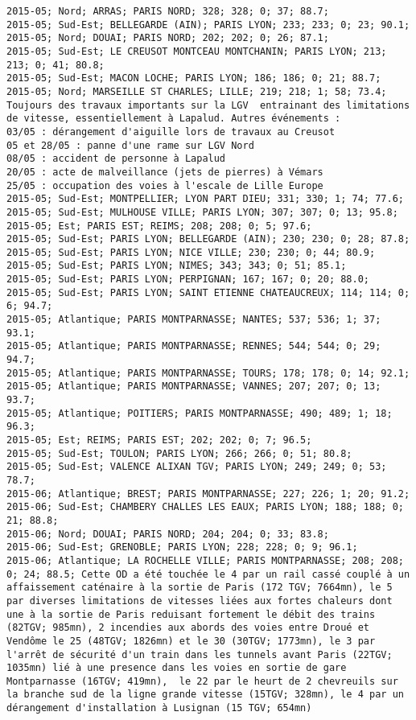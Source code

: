 \documentclass{article}
\begin{document}
\begin{Verbatim}[commandchars=\\\{\}]
2015-05; Nord; ARRAS; PARIS NORD; 328; 328; 0; 37; 88.7; 
2015-05; Sud-Est; BELLEGARDE (AIN); PARIS LYON; 233; 233; 0; 23; 90.1; 
2015-05; Nord; DOUAI; PARIS NORD; 202; 202; 0; 26; 87.1; 
2015-05; Sud-Est; LE CREUSOT MONTCEAU MONTCHANIN; PARIS LYON; 213; 213; 0; 41; 80.8; 
2015-05; Sud-Est; MACON LOCHE; PARIS LYON; 186; 186; 0; 21; 88.7; 
2015-05; Nord; MARSEILLE ST CHARLES; LILLE; 219; 218; 1; 58; 73.4; Toujours des travaux importants sur la LGV  entrainant des limitations de vitesse, essentiellement à Lapalud. Autres événements :
03/05 : dérangement d'aiguille lors de travaux au Creusot
05 et 28/05 : panne d'une rame sur LGV Nord
08/05 : accident de personne à Lapalud
20/05 : acte de malveillance (jets de pierres) à Vémars
25/05 : occupation des voies à l'escale de Lille Europe
2015-05; Sud-Est; MONTPELLIER; LYON PART DIEU; 331; 330; 1; 74; 77.6; 
2015-05; Sud-Est; MULHOUSE VILLE; PARIS LYON; 307; 307; 0; 13; 95.8; 
2015-05; Est; PARIS EST; REIMS; 208; 208; 0; 5; 97.6; 
2015-05; Sud-Est; PARIS LYON; BELLEGARDE (AIN); 230; 230; 0; 28; 87.8; 
2015-05; Sud-Est; PARIS LYON; NICE VILLE; 230; 230; 0; 44; 80.9; 
2015-05; Sud-Est; PARIS LYON; NIMES; 343; 343; 0; 51; 85.1; 
2015-05; Sud-Est; PARIS LYON; PERPIGNAN; 167; 167; 0; 20; 88.0; 
2015-05; Sud-Est; PARIS LYON; SAINT ETIENNE CHATEAUCREUX; 114; 114; 0; 6; 94.7; 
2015-05; Atlantique; PARIS MONTPARNASSE; NANTES; 537; 536; 1; 37; 93.1; 
2015-05; Atlantique; PARIS MONTPARNASSE; RENNES; 544; 544; 0; 29; 94.7; 
2015-05; Atlantique; PARIS MONTPARNASSE; TOURS; 178; 178; 0; 14; 92.1; 
2015-05; Atlantique; PARIS MONTPARNASSE; VANNES; 207; 207; 0; 13; 93.7; 
2015-05; Atlantique; POITIERS; PARIS MONTPARNASSE; 490; 489; 1; 18; 96.3; 
2015-05; Est; REIMS; PARIS EST; 202; 202; 0; 7; 96.5; 
2015-05; Sud-Est; TOULON; PARIS LYON; 266; 266; 0; 51; 80.8; 
2015-05; Sud-Est; VALENCE ALIXAN TGV; PARIS LYON; 249; 249; 0; 53; 78.7; 
2015-06; Atlantique; BREST; PARIS MONTPARNASSE; 227; 226; 1; 20; 91.2; 
2015-06; Sud-Est; CHAMBERY CHALLES LES EAUX; PARIS LYON; 188; 188; 0; 21; 88.8; 
2015-06; Nord; DOUAI; PARIS NORD; 204; 204; 0; 33; 83.8; 
2015-06; Sud-Est; GRENOBLE; PARIS LYON; 228; 228; 0; 9; 96.1; 
2015-06; Atlantique; LA ROCHELLE VILLE; PARIS MONTPARNASSE; 208; 208; 0; 24; 88.5; Cette OD a été touchée le 4 par un rail cassé couplé à un affaissement caténaire à la sortie de Paris (172 TGV; 7664mn), le 5 par diverses limitations de vitesses liées aux fortes chaleurs dont une à la sortie de Paris reduisant fortement le débit des trains (82TGV; 985mn), 2 incendies aux abords des voies entre Droué et Vendôme le 25 (48TGV; 1826mn) et le 30 (30TGV; 1773mn), le 3 par l'arrêt de sécurité d'un train dans les tunnels avant Paris (22TGV; 1035mn) lié à une presence dans les voies en sortie de gare Montparnasse (16TGV; 419mn),  le 22 par le heurt de 2 chevreuils sur la branche sud de la ligne grande vitesse (15TGV; 328mn), le 4 par un dérangement d'installation à Lusignan (15 TGV; 654mn)

\end{Verbatim}
\end{document}
